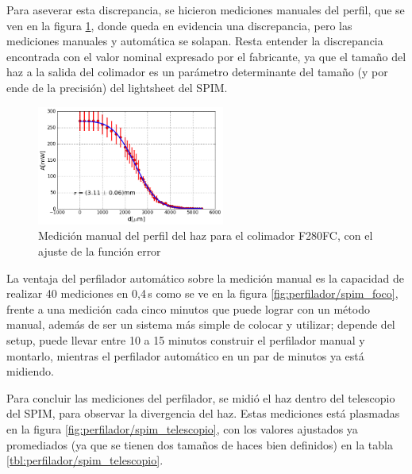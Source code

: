 Para aseverar esta discrepancia, se hicieron mediciones manuales del perfil, que se ven en la figura \ref{fig:perfilador/spim_foco_manual}, donde queda en evidencia una discrepancia, pero las mediciones manuales y automática se solapan. Resta entender la discrepancia encontrada con el valor nominal expresado por el fabricante, ya que el tamaño del haz a la salida del colimador es un parámetro determinante del tamaño (y por ende de la precisión) del lightsheet del SPIM.

\begin{figure}[H]
    \centering
    \includegraphics[width=0.55\textwidth]{fig/perfilador/calibracion_f280}
    \caption{Medición manual del perfil del haz para el colimador F280FC, con el ajuste de la función error}
    \label{fig:perfilador/spim_foco_manual}
\end{figure}

La ventaja del perfilador automático sobre la medición manual es la capacidad de realizar 40 mediciones en 0,4$\,$s como se ve en la figura \ref{fig:perfilador/spim_foco}, frente a una medición cada cinco minutos que puede lograr con un método manual, además de ser un sistema más simple de colocar y utilizar; depende del setup, puede llevar entre 10 a 15 minutos construir el perfilador manual y montarlo, mientras el perfilador automático en un par de minutos ya está midiendo. 

Para concluir las mediciones del perfilador, se midió el haz dentro del telescopio del SPIM, para observar la divergencia del haz. Estas mediciones está plasmadas en la figura \ref{fig:perfilador/spim_telescopio}, con los valores ajustados ya promediados (ya que se tienen dos tamaños de haces bien definidos) en la tabla \ref{tbl:perfilador/spim_telescopio}.

